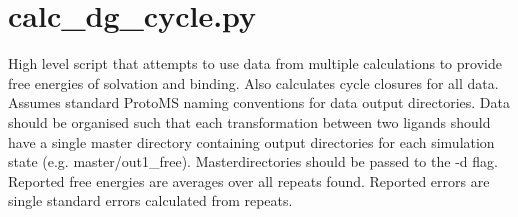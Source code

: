\documentclass[letterpaper,10pt,english]{sphinxmanual}
\begin{document}
\section{calc\_dg\_cycle.py}
\label{\detokenize{tools:calc-dg-cycle-py}}

High level script that attempts to use data from multiple calculations to provide free energies of solvation and binding. Also calculates cycle closures for all data. Assumes standard ProtoMS naming conventions for data output directories. Data should be organised such that each transformation between two ligands should have a single master directory containing output directories for each simulation state (e.g. master/out1\_free). Masterdirectories should be passed to the -d flag. Reported free energies are averages over all repeats found. Reported errors are single standard errors calculated from repeats.


%
\begin{sphinxVerbatim}[commandchars=\\\{\}]
  \PYG{p}{[}\PYG{p}{]} \PYG{p}{[} \PYG{p}{]} \PYG{p}{[} \PYG{p}{]}
                        \PYG{p}{[} \PYG{p}{]} \PYG{p}{[} \PYG{p}{]}
                        \PYG{p}{[} \PYG{p}{[}\PYG{p}{]}\PYG{p}{]} \PYG{p}{[}\PYG{p}{]} \PYG{p}{[} \PYG{p}{]}
                        \PYG{p}{[} \PYG{p}{]}   \PYG{p}{[} \PYG{p}{]} 
                         \PYG{p}{[} \PYG{p}{]}
                        \PYG{p}{[}  \PYG{p}{[} \PYG{p}{]}\PYG{p}{]}
                        \PYG{p}{[} \PYG{p}{]}
                           
\end{sphinxVerbatim}
\end{document}

